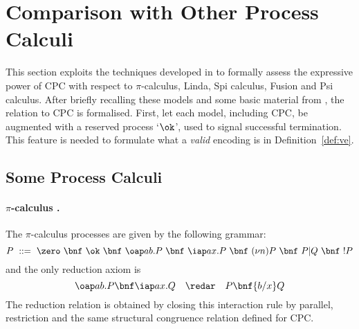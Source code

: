 \documentclass{LMCS}
\begin{document}
\section{Comparison with Other Process Calculi}
\label{sec:compare}

This section exploits the techniques developed in \cite{G:IC08,G:CONCUR08} to formally
assess the expressive power of CPC with respect to $\pi$-calculus, Linda, Spi calculus, Fusion and Psi calculus.
After briefly recalling these models and some basic material from \cite{G:CONCUR08}, the 
relation to CPC is formalised. First, let each model, including CPC, be augmented with
a reserved process `$\ok$', used to signal successful termination.
This feature is needed to formulate what a {\em valid} encoding is in Definition~\ref{def:ve}.


\subsection{Some Process Calculi}
\label{subsec:calculi}

\paragraph{$\pi$-calculus \cite{milner.parrow.ea:calculus-mobile,sangiorgi.walker:theory-mobile}.}
The $\pi$-calculus processes are given by the following grammar:
$$
P \ ::= \ \zero \ \bnf \ \ok \ \bnf \ \oap a b.P\ \bnf \ \iap a x.P \ \bnf \ 
(\nu n) P \ \bnf \ P | Q \ \bnf \ !P
$$
and the only reduction axiom is
$$
\oap a b .P\bnf \iap a x.Q \quad\redar\quad P\bnf \{b/x\}Q
$$
The reduction relation is obtained by closing this interaction rule by parallel, restriction and the
same structural congruence relation defined for CPC.
\end{document}
